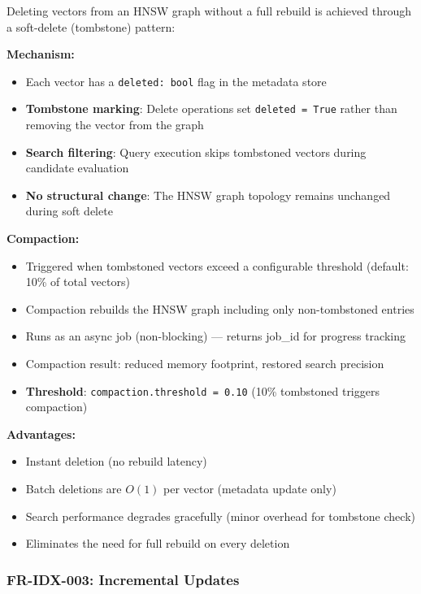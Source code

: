 \documentclass[11pt,a4paper]{article}
\newcommand{\cmark}{\textcolor{ctAccentGreen}{\ding{51}}}
\newcommand{\inlinecode}[1]{\texttt{\small\colorbox{ctCodeBg}{#1}}}
\begin{document}
\begin{reqbox}
Deleting vectors from an HNSW graph without a full rebuild is achieved through a soft-delete (tombstone) pattern:

\textbf{Mechanism:}
\begin{itemize}
    \item Each vector has a \inlinecode{deleted: bool} flag in the metadata store
    \item \textbf{Tombstone marking}: Delete operations set \inlinecode{deleted = True} rather than removing the vector from the graph
    \item \textbf{Search filtering}: Query execution skips tombstoned vectors during candidate evaluation
    \item \textbf{No structural change}: The HNSW graph topology remains unchanged during soft delete
\end{itemize}

\textbf{Compaction:}
\begin{itemize}
    \item Triggered when tombstoned vectors exceed a configurable threshold (default: 10\% of total vectors)
    \item Compaction rebuilds the HNSW graph including only non-tombstoned entries
    \item Runs as an async job (non-blocking) --- returns job\_id for progress tracking
    \item Compaction result: reduced memory footprint, restored search precision
    \item \textbf{Threshold}: \inlinecode{compaction.threshold = 0.10} (10\% tombstoned triggers compaction)
\end{itemize}

\textbf{Advantages:}
\begin{itemize}
    \item \cmark{} Instant deletion (no rebuild latency)
    \item \cmark{} Batch deletions are $O(1)$ per vector (metadata update only)
    \item \cmark{} Search performance degrades gracefully (minor overhead for tombstone check)
    \item \cmark{} Eliminates the need for full rebuild on every deletion
\end{itemize}
\end{reqbox}

\subsubsection{FR-IDX-003: Incremental Updates}
\end{document}

